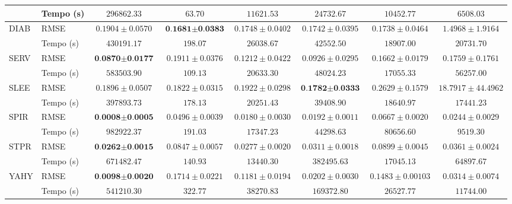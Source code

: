 \begin{landscape}
\begin{table}
\begin{tabular}{l|l|c@{\hskip 5pt}c@{\hskip 5pt}c@{\hskip 5pt}c@{\hskip 5pt}c@{\hskip 5pt}c}
                                    & Tempo (s) & $296862.33$ & $63.70$ & $11621.53$ & $24732.67$ & $10452.77$ & $6508.03$ \\
            \midrule
            \multirow{2}{*}{DIAB}   & RMSE & $0.1904 \pm 0.0570$ & $\textbf{0.1681} \pm \textbf{0.0383}$ & $0.1748 \pm 0.0402$ & $0.1742 \pm 0.0395$ & $0.1738 \pm 0.0464$ & $1.4968 \pm 1.9164$ \\
                                    & Tempo (s) & $430191.17$ & $198.07$ & $26038.67$ & $42552.50$ & $18907.00$ & $20731.70$ \\
            \midrule
            \multirow{2}{*}{SERV}   & RMSE & $\textbf{0.0870} \pm \textbf{0.0177}$ & $0.1911 \pm 0.0376$ & $0.1212 \pm 0.0422$ & $0.0926 \pm 0.0295$ & $0.1662 \pm 0.0179$ & $0.1759 \pm 0.1761$ \\
                                    & Tempo (s) & $583503.90$ & $109.13$ & $20633.30$ & $48024.23$ & $17055.33$ & $56257.00$ \\
            \midrule
            \multirow{2}{*}{SLEE}   & RMSE & $0.1896 \pm 0.0507$ & $0.1822 \pm 0.0315$ & $0.1922 \pm 0.0298$ & $\textbf{0.1782} \pm \textbf{0.0333}$ & $0.2629 \pm 0.1579$ & $18.7917 \pm 44.4962$ \\
                                    & Tempo (s) & $397893.73$ & $178.13$ & $20251.43$ & $39408.90$ & $18640.97$ & $17441.23$ \\
            \midrule
            \multirow{2}{*}{SPIR}   & RMSE & $\textbf{0.0008} \pm \textbf{0.0005}$ & $0.0496 \pm 0.0039$ & $0.0180 \pm 0.0030$ & $0.0192 \pm 0.0011$ & $0.0667 \pm 0.0020$ & $0.0244 \pm 0.0029$ \\
                                    & Tempo (s) & $982922.37$ & $191.03$ & $17347.23$ & $44298.63$ & $80656.60$ & $9519.30$ \\
            \midrule
            \multirow{2}{*}{STPR}   & RMSE & $\textbf{0.0262} \pm \textbf{0.0015}$ & $0.0847 \pm 0.0057$ & $0.0277 \pm 0.0020$ & $0.0311 \pm 0.0018$ & $0.0899 \pm 0.0045$ & $0.0361 \pm 0.0024$ \\
                                    & Tempo (s) & $671482.47$ & $140.93$ & $13440.30$ & $382495.63$ & $17045.13$ & $64897.67$ \\
            \midrule
            \multirow{2}{*}{YAHY}   & RMSE & $\textbf{0.0098} \pm \textbf{0.0020}$ & $0.1714 \pm 0.0221$ & $0.1181 \pm 0.0194$ & $0.0202 \pm 0.0030$ & $0.1483 \pm 0.00103$ & $0.0314 \pm 0.0074$ \\
                                    & Tempo (s) & $541210.30$ & $322.77$ & $38270.83$ & $169372.80$ & $26527.77$ & $11744.00$ \\

\end{tabular}
\end{table}
\end{landscape}
